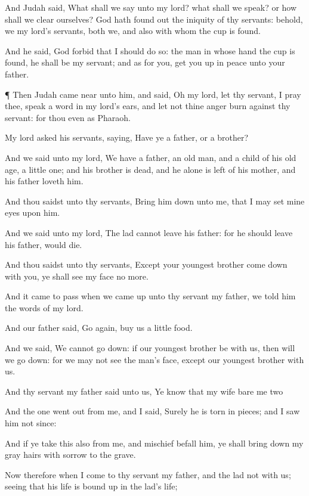{And
Judah
said, What shall we
say unto my
lord? what shall we
speak? or how shall we clear
ourselves?
God hath found
out the
iniquity of thy
servants: behold, we
{} my
lord’s
servants, both we, and
{}
also with
whom the
cup is
found.

And he
said, God
forbid that I should
do
so:
{} the
man in whose
hand the
cup is
found, he shall be my
servant; and as for you, get you
up in
peace unto your
father.


\par }{\PP {}¶ Then
Judah came
near unto him, and
said,
Oh my
lord, let thy
servant, I pray thee,
speak a
word in my
lord’s
ears, and let not thine
anger
burn against thy
servant: for thou
{} even as
Pharaoh.

My
lord
asked his
servants,
saying,
Have ye a
father, or a
brother?

And we
said unto my
lord, We
have a
father, an old
man, and a
child of his old
age, a little
one; and his
brother is
dead, and he alone is
left of his
mother, and his
father
loveth him.

And thou
saidst unto thy
servants, Bring him
down unto me, that I may
set mine
eyes upon him.

And we
said unto my
lord, The
lad
cannot
leave his
father: for
{} he should
leave his
father,
{} would
die.

And thou
saidst unto thy
servants,
Except your
youngest
brother come
down with you, ye shall
see my
face no
more.

And it came to pass when we came
up unto thy
servant my
father, we
told him the
words of my
lord.

And our
father
said, Go
again,
{}
buy us a
little
food.

And we
said, We
cannot go
down: if our
youngest
brother
be with us, then will we go
down: for we
may not
see the
man’s
face,
except our
youngest
brother
{} with us.

And thy
servant my
father
said unto us, Ye
know that my
wife
bare me
two
{}

And the
one went
out from me, and I
said,
Surely he is torn in
pieces; and I saw
him not
since:

And if ye
take this also
from
me, and
mischief befall
him, ye shall bring
down my gray
hairs with
sorrow to the
grave.

Now therefore when I
come to thy
servant my
father, and the
lad
{} not with us; seeing that his
life is bound
up in the
lad’s life;

}
